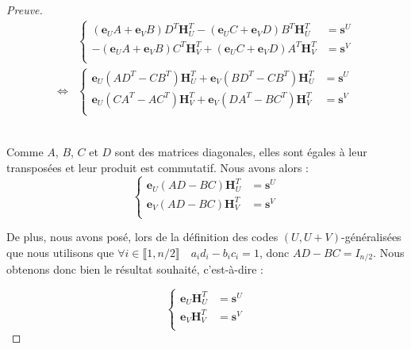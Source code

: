 \documentclass[12pt]{article}
\theoremstyle{plain}
\newcommand{\e}{\mathbf{e}}
\newcommand{\s}{\mathbf{s}}
\begin{document}
\begin{proof}[Preuve]
\begin{equation*}
\begin{aligned}
&\left\{
\begin{split}
(\e_UA+\e_VB)D^T\mathbf{H}_U^T - (\e_UC+\e_VD)B^T\mathbf{H}_U^T &= \s^U \\ 
-(\e_UA+\e_VB)C^T\mathbf{H}_V^T + (\e_UC+\e_VD)A^T\mathbf{H}_V^T &= \s^V \\
\end{split}
\right.\\
\iff
&\left\{
\begin{split}
\e_U(AD^T - CB^T)\mathbf{H}_U^T + \e_V(BD^T-CB^T)\mathbf{H}_U^T &= \s^U \\ 
\e_U(CA^T - AC^T)\mathbf{H}_V^T + \e_V(DA^T-BC^T)\mathbf{H}_V^T &= \s^V \\ 
\end{split}
\right.
\end{aligned}
\end{equation*}\

\noindent Comme $A$, $B$, $C$ et $D$ sont des matrices diagonales, elles sont égales à leur transposées et leur produit est commutatif. Nous avons alors :
\begin{equation*}
\left\{
\begin{split}
\e_U(AD - BC)\mathbf{H}_U^T &= \s^U\\
\e_V(AD - BC)\mathbf{H}_V^T &= \s^V\\
\end{split}
\right.
\end{equation*}

\noindent De plus, nous avons posé, lors de la définition des codes $(U,U+V)$-généralisées que nous utilisons que $\forall i \in \llbracket 1,n/2\rrbracket \quad a_id_i - b_ic_i = 1$, donc $AD-BC = I_{n/2}$. Nous obtenons donc bien le résultat souhaité, c'est-à-dire :

\begin{equation*}
\left\{
\begin{split}
\e_U\mathbf{H}_U^T &= \s^U\\
\e_V\mathbf{H}_V^T &= \s^V\\
\end{split}
\right.
\end{equation*}

\end{proof}
\end{document}
